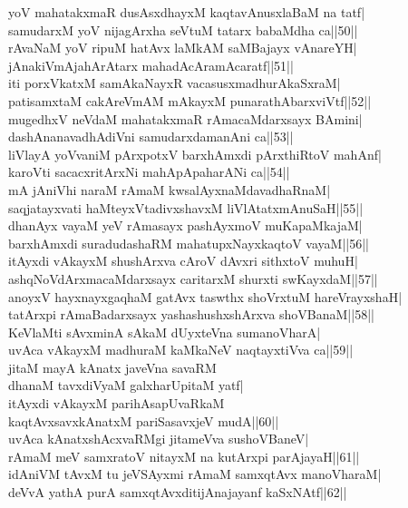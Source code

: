\documentclass{article}
\begin{document}
yoV mahatakxmaR dusAsxdhayxM kaqtavAnusxlaBaM na tatf|\\
samudarxM yoV nijagArxha seVtuM tatarx babaMdha ca||50||\\
rAvaNaM yoV ripuM hatAvx laMkAM saMBajayx vAnareYH|\\
jAnakiVmAja{hA}rAtarx mahadAcAramAcaratf||51||\\
iti porxVkatxM samAkaNayxR vacasusxmadhurAkaSxraM|\\
patisamxtaM cakAreVmAM mAkayxM punarathAbarxviVtf||52||\\
mugedhxV neVdaM mahatakxmaR rAmacaMdarxsayx BAmini|\\
dashAnanavadhAdiVni samudarxdamanAni ca||53||\\
liVlayA yoVvaniM pArxpotxV barxhAmxdi pArxthiRtoV mahAnf|\\
karoVti sacacxritArxNi mahApApaharANi ca||54||\\
mA jAniVhi naraM rAmaM kwsalAyxnaMdavadhaRnaM|\\
saqjatayxvati haMteyxVtadivxshavxM liVlAtatxmAnuSaH||55||\\
dhanAyx vayaM yeV rAmasayx pashAyxmoV muKapaMkajaM|\\
barxhAmxdi suradudashaRM mahatupxNayxkaqtoV vayaM||56||\\
itAyxdi vAkayxM shushArxva cAroV dAvxri sithxtoV muhuH|\\
ashqNoVdArxmacaMdarxsayx caritarxM shurxti swKayxdaM||57||\\
anoyxV hayxnayxgaqhaM gatAvx taswthx shoVrxtuM hareVrayxshaH|\\
tatArxpi rAmaBadarxsayx yashashushxshArxva shoVBanaM||58||\\
KeVlaMti sAvxminA sAkaM dUyxteVna sumanoVharA|\\
uvAca vAkayxM madhuraM kaMkaNeV naqtayxtiVva ca||59||\\
jitaM mayA kAnatx javeVna savaRM\\
dhanaM tavxdiVyaM galxharUpitaM yatf|\\
itAyxdi vAkayxM parihAsapUvaRkaM\\
kaqtAvxsavxkAnatxM pariSasavxjeV mudA||60||\\
uvAca kAnatxshAcxvaRMgi jitameVva sushoVBaneV|\\
rAmaM meV samxratoV nitayxM na kutArxpi parAjayaH||61||\\
idAniVM tAvxM tu jeVSAyxmi rAmaM samxqtAvx manoVharaM|\\
deVvA yathA purA samxqtAvxditijAnajayanf kaSxNAtf||62||\\
\end{document}

